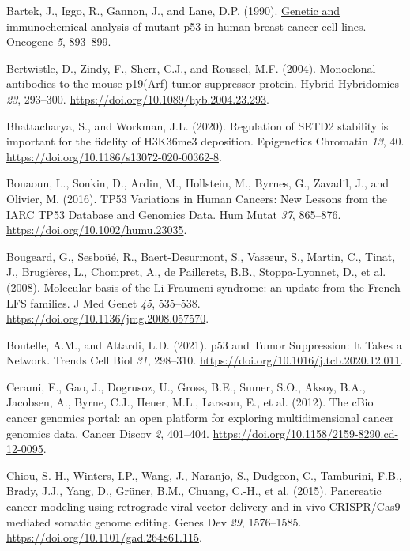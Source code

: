 \begin{CSLReferences}{0}{0}
\leavevmode{}%
Bartek, J., Iggo, R., Gannon, J., and Lane, D.P. (1990). \href{https://www.ncbi.nlm.nih.gov/pubmed/1694291}{Genetic and immunochemical analysis of mutant p53 in human breast cancer cell lines.} Oncogene \emph{5}, 893--899.

\leavevmode{}%
Bertwistle, D., Zindy, F., Sherr, C.J., and Roussel, M.F. (2004). Monoclonal antibodies to the mouse p19(Arf) tumor suppressor protein. Hybrid Hybridomics \emph{23}, 293--300. \url{https://doi.org/10.1089/hyb.2004.23.293}.

\leavevmode{}%
Bhattacharya, S., and Workman, J.L. (2020). Regulation of SETD2 stability is important for the fidelity of H3K36me3 deposition. Epigenetics Chromatin \emph{13}, 40. \url{https://doi.org/10.1186/s13072-020-00362-8}.

\leavevmode{}%
Bouaoun, L., Sonkin, D., Ardin, M., Hollstein, M., Byrnes, G., Zavadil, J., and Olivier, M. (2016). TP53 Variations in Human Cancers: New Lessons from the IARC TP53 Database and Genomics Data. Hum Mutat \emph{37}, 865--876. \url{https://doi.org/10.1002/humu.23035}.

\leavevmode{}%
Bougeard, G., Sesboüé, R., Baert-Desurmont, S., Vasseur, S., Martin, C., Tinat, J., Brugières, L., Chompret, A., de Paillerets, B.B., Stoppa-Lyonnet, D., et al. (2008). Molecular basis of the Li-Fraumeni syndrome: an update from the French LFS families. J Med Genet \emph{45}, 535--538. \url{https://doi.org/10.1136/jmg.2008.057570}.

\leavevmode{}%
Boutelle, A.M., and Attardi, L.D. (2021). p53 and Tumor Suppression: It Takes a Network. Trends Cell Biol \emph{31}, 298--310. \url{https://doi.org/10.1016/j.tcb.2020.12.011}.

\leavevmode{}%
Cerami, E., Gao, J., Dogrusoz, U., Gross, B.E., Sumer, S.O., Aksoy, B.A., Jacobsen, A., Byrne, C.J., Heuer, M.L., Larsson, E., et al. (2012). The cBio cancer genomics portal: an open platform for exploring multidimensional cancer genomics data. Cancer Discov \emph{2}, 401--404. \url{https://doi.org/10.1158/2159-8290.cd-12-0095}.

\leavevmode{}%
Chiou, S.-H., Winters, I.P., Wang, J., Naranjo, S., Dudgeon, C., Tamburini, F.B., Brady, J.J., Yang, D., Grüner, B.M., Chuang, C.-H., et al. (2015). Pancreatic cancer modeling using retrograde viral vector delivery and in vivo CRISPR/Cas9-mediated somatic genome editing. Genes Dev \emph{29}, 1576--1585. \url{https://doi.org/10.1101/gad.264861.115}.


\end{CSLReferences}
